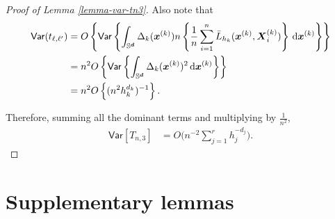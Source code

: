 \documentclass[oneside,11pt]{article}
\begin{document}
\begin{proof}[Proof of Lemma \ref{lemma-var-tn3}]
Also note that 
\begin{align*}
     \mathsf{Var} (t_{\ell,\ell'}) &= O \left\{ \mathsf{Var} \left\{ \int_{\mathbb{S}^{\boldsymbol{d}}} \Delta_k(\boldsymbol{x}^{(k)}) n \left\{\frac{1}{n} \sum_{i=1}^{n} \bar{L}_{h_k} (\boldsymbol{x}^{(k)},\boldsymbol{X}_i^{(k)})\right\} \,\mathrm{d}\boldsymbol{x}^{(k)}\right\}\right\} \\
     &= n^2 O \left\{ \mathsf{Var} \left\{ \int_{\mathbb{S}^{\boldsymbol{d}}} \Delta_k(\boldsymbol{x}^{(k)})^2 \,\mathrm{d}\boldsymbol{x}^{(k)}\right\}\right\} \\
     &= n^2 O \left\{(n^2 h_k^{d_k})^{-1}\right\}.
\end{align*}

Therefore, summing all the dominant terms and multiplying by $\frac{1}{n^2}$, 
\begin{align*}
        \mathsf{Var} [T_{n,3}] &=  O \Bigg(n^{-2} \sum_{j=1}^{r} h_j^{-d_j} \Bigg).
    \end{align*}

\end{proof}

\section{Supplementary lemmas}
\label{sec:lemmas}

%
\end{document}
